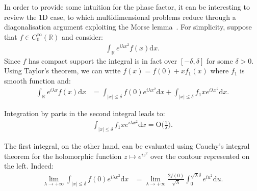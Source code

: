 \documentclass[a4paper, 10pt]{article}
\theoremstyle{remark}
\newcommand{\R}{\mathbb{R}}
\newcommand{\bigO}[1]{\textrm{O(}#1\textrm{)}}
\begin{document}
In order to provide some intuition for the phase factor, it can be interesting to review the 1D case, to which multidimensional problems reduce through a diagonalisation argument exploiting the Morse lemma~\cite[Lemma 3.2.3]{Hormander_1971}. For simplicity, suppose that $f \in C_0^{\infty}(\R)$ and consider:
%
\begin{align}
    \int_\R e^{i\lambda x^2}f(x)\textrm{d} x.
\end{align} 
Since $f$ has compact support the integral is in fact over $[-\delta,\delta]$ for some $\delta >0$. Using Taylor's theorem, we can write $f(x)=f(0)+xf_1(x)$ where $f_1$ is smooth function and:
\begin{align}
    \int_\R e^{i\lambda x}f(x)\textrm{d}x &= \int_{|x|\leq \delta} f(0)e^{i\lambda x^2} \textrm{d}x  + \int_{|x|\leq \delta} f_1xe^{i\lambda x^2}\textrm{d}x.
\end{align}

Integration by parts in the second integral leads to:
%
\begin{align}
    \int_{|x|\leq \delta} f_1xe^{i\lambda x^2}\textrm{d}x=\bigO{\frac{1}{\lambda}}.
\end{align}

\begin{figure}
    \begin{center}
    \end{center}
\end{figure} 

The first integral, on the other hand, can be evaluated using Cauchy's integral theorem for the holomorphic function $z \mapsto e^{i z^2}$ over the contour represented on the left. Indeed:
\begin{align}
\lim_{\lambda \to +\infty} \int_{|x|\leq \delta} f(0)e^{i\lambda x^2} \textrm{d}x &=  \lim_{\lambda \to +\infty} \frac{2 f(0)}{\sqrt{\lambda}}\int_{0}^{\sqrt{\lambda}\delta} e^{iu^2}\textrm{d}u.
    \end{align}
\end{document}
